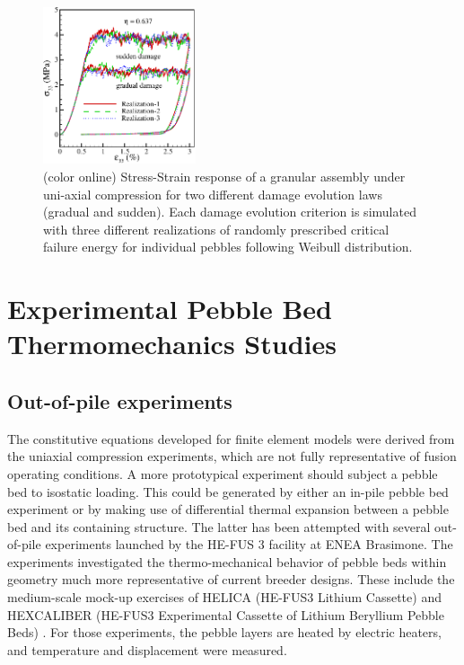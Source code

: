 \begin{figure}[t!]
\begin{center}
\includegraphics[width=0.4\textwidth]{chapters/figures/Fig-5}
\end{center}
\caption{(color online) Stress-Strain response of a granular assembly under uni-axial compression for two different damage evolution laws (gradual and sudden). Each damage evolution criterion is simulated with three different realizations of randomly prescribed critical failure energy for individual pebbles following Weibull distribution.}
\label{fig:stress-strain-effect}
\end{figure}



\section{Experimental Pebble Bed Thermomechanics Studies}
\subsection{Out-of-pile experiments}
The constitutive equations developed for finite element models were derived from the uniaxial compression experiments, which are not fully representative of fusion operating conditions. A more prototypical experiment should subject a pebble bed to isostatic loading. This could be generated by either an in-pile pebble bed experiment or by making use of differential thermal expansion between a pebble bed and its containing structure. The latter has been attempted with several out-of-pile experiments launched by the HE-FUS 3 facility at ENEA Brasimone. The experiments investigated the thermo-mechanical behavior of pebble beds within geometry much more representative of current breeder designs. These include the medium-scale mock-up exercises of HELICA (HE-FUS3 Lithium Cassette) and HEXCALIBER (HE-FUS3 Experimental Cassette of Lithium Beryllium Pebble Beds) \cite{dellorco:2006,DiMaio20081287}. For those experiments, the pebble layers are heated by electric heaters, and temperature and displacement were measured.

